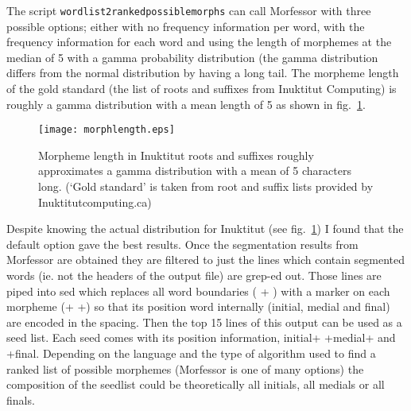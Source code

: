 \documentclass[runningheads,a4paper]{llncs}
\begin{document}
The script {\tt wordlist2rankedpossiblemorphs} can call Morfessor with three possible options; either with no frequency information per word, with the frequency information for each word and using the length of morphemes at the median of 5 with a gamma probability distribution (the gamma distribution differs from the normal distribution by having a long tail. The morpheme length of the gold standard (the list of roots and suffixes from Inuktitut Computing) is roughly a gamma distribution with a mean length of 5 as shown in fig.~\ref{fig:morphlength}. 


\begin{figure}[htb]
	\texttt{[image: morphlength.eps]}
	\caption{Morpheme length in Inuktitut roots and suffixes roughly approximates a gamma distribution with a mean of 5 characters long. (`Gold standard' is taken from root and suffix lists provided by Inuktitutcomputing.ca)}
	\label{fig:morphlength}
\end{figure}

Despite knowing the actual distribution for Inuktitut (see fig.~\ref{fig:morphlength}) I found that the default option gave the best results. Once the segmentation results from Morfessor are obtained they are filtered to just the lines which contain  segmented words (ie. not the headers of the output file) are grep-ed out. Those lines are piped into sed which replaces all word boundaries ( + ) with a marker on each morpheme (+ +) so that its position word internally (initial, medial and final) are encoded in the spacing. Then the top 15 lines of this output can be used as a seed list. Each seed comes with its position information, initial+ +medial+ and +final. Depending on the language and the type of algorithm used to find a ranked list of possible morphemes (Morfessor is one of many options) the composition of the seedlist could be theoretically all initials, all medials or all finals.
\end{document}
